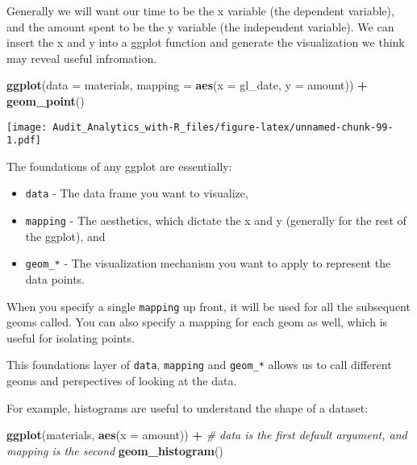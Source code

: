 \documentclass[
]{book}
\newenvironment{Shaded}{\begin{snugshade}}{\end{snugshade}}
\newcommand{\CommentTok}[1]{\textcolor[rgb]{0.56,0.35,0.01}{\textit{#1}}}
\newcommand{\DataTypeTok}[1]{\textcolor[rgb]{0.13,0.29,0.53}{#1}}
\newcommand{\KeywordTok}[1]{\textcolor[rgb]{0.13,0.29,0.53}{\textbf{#1}}}
\newcommand{\NormalTok}[1]{#1}
\newcommand{\OperatorTok}[1]{\textcolor[rgb]{0.81,0.36,0.00}{\textbf{#1}}}
\newcommand{\StringTok}[1]{\textcolor[rgb]{0.31,0.60,0.02}{#1}}
\providecommand{\tightlist}{%
  \setlength{\itemsep}{0pt}\setlength{\parskip}{0pt}}
\begin{document}
Generally we will want our time to be the x variable (the dependent variable), and the amount spent to be the y variable (the independent variable). We can insert the x and y into a ggplot function and generate the visualization we think may reveal useful infromation.

\begin{Shaded}
\begin{Highlighting}[]
\KeywordTok{ggplot}\NormalTok{(}\DataTypeTok{data =}\NormalTok{ materials, }\DataTypeTok{mapping =} \KeywordTok{aes}\NormalTok{(}\DataTypeTok{x =}\NormalTok{ gl_date, }\DataTypeTok{y =}\NormalTok{ amount)) }\OperatorTok{+}
\StringTok{  }\KeywordTok{geom_point}\NormalTok{()}
\end{Highlighting}
\end{Shaded}

\texttt{[image: Audit\_Analytics\_with-R\_files/figure-latex/unnamed-chunk-99-1.pdf]}

The foundations of any ggplot are essentially:

\begin{itemize}
\tightlist
\item
  \texttt{data} - The data frame you want to visualize,
\item
  \texttt{mapping} - The aesthetics, which dictate the x and y (generally for the rest of the ggplot), and
\item
  \texttt{geom\_*} - The visualization mechanism you want to apply to represent the data points.
\end{itemize}

When you specify a single \texttt{mapping} up front, it will be used for all the subsequent geoms called. You can also specify a mapping for each geom as well, which is useful for isolating points.

This foundations layer of \texttt{data}, \texttt{mapping} and \texttt{geom\_*} allows us to call different geoms and perspectives of looking at the data.

For example, histograms are useful to understand the shape of a dataset:

\begin{Shaded}
\begin{Highlighting}[]
\KeywordTok{ggplot}\NormalTok{(materials, }\KeywordTok{aes}\NormalTok{(}\DataTypeTok{x =}\NormalTok{ amount)) }\OperatorTok{+}\StringTok{ }\CommentTok{# data is the first default argument, and mapping is the second}
\StringTok{  }\KeywordTok{geom_histogram}\NormalTok{()}
\end{Highlighting}
\end{Shaded}
\end{document}
